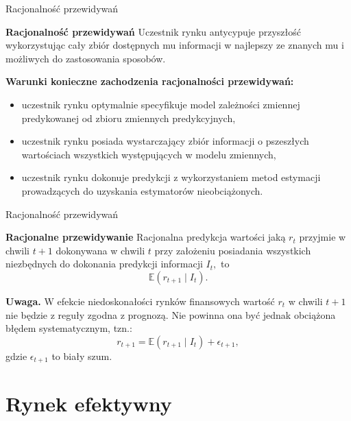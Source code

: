 \documentclass[a4paper, 11pt]{beamer}
\begin{document}
	\begin{frame}{Racjonalność przewidywań}
		\begin{block}{\textbf{Racjonalność przewidywań}}
			Uczestnik rynku antycypuje przyszłość wykorzystując cały zbiór dostępnych mu informacji w najlepszy
			ze znanych mu i możliwych do zastosowania sposobów.
		\end{block}
		\textbf{Warunki konieczne zachodzenia racjonalności przewidywań:}
		\begin{itemize}
			\item uczestnik rynku optymalnie specyfikuje model zależności zmiennej predykowanej od zbioru zmiennych
				predykcyjnych,
			\item uczestnik rynku posiada wystarczający zbiór informacji o pszeszłych wartościach wszystkich
				występujących w modelu zmiennych,
			\item uczestnik rynku dokonuje predykcji z wykorzystaniem metod estymacji prowadzących do uzyskania
				estymatorów nieobciążonych.
		\end{itemize}
	\end{frame}
	
	\begin{frame}{Racjonalność przewidywań}
		\begin{block}{\textbf{Racjonalne przewidywanie}}
			Racjonalna predykcja wartości jaką $r_t$ przyjmie w chwili $t+1$ dokonywana w chwili $t$ przy założeniu
			posiadania wszystkich niezbędnych do dokonania predykcji informacji $I_t,$ to \[
				\mathbb{E}\left(r_{t+1} \mid I_t\right).
			\]
		\end{block}
		\begin{alert}{\textbf{Uwaga.}}
			W efekcie niedoskonałości rynków finansowych wartość $r_t$ w chwili $t+1$ nie będzie z reguły zgodna
			z prognozą. Nie powinna ona być jednak obciążona błędem systematycznym, tzn.: \[
				r_{t+1} = \mathbb{E}\left(r_{t+1} \mid I_t\right) + \epsilon_{t+1},
			\] gdzie $\epsilon_{t+1}$ to biały szum.
		\end{alert}
	\end{frame}
	
	\section{Rynek efektywny}
	
\end{document}
